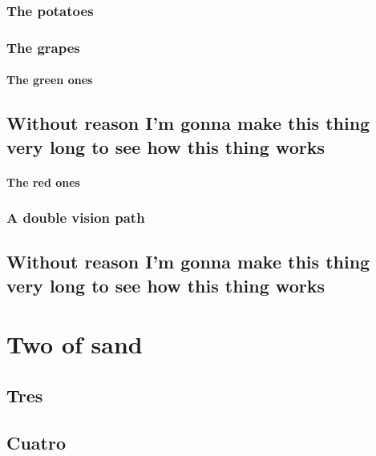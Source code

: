\documentclass[draft]{qx-files/qx-book}
\begin{document}
\section{The potatoes}

\lipsum[1-10]



\lipsum[1]

\ExerciseSection

\section{The grapes}

\lipsum[1]

\subsection{The green ones}

\lipsum[1]

\chapter*{Without reason I'm gonna make this thing very long to see how this thing works}

\subsection{The red ones}

\lipsum[1-2]

\section{A double vision path}

\lipsum

\chapter[Título largo]{Without reason I'm gonna make this thing very long to see how this thing works}
\lipsum


\part{Two of sand}

\chapter{Tres}
\lipsum


\chapter{Cuatro}
\lipsum[1]
\end{document}
